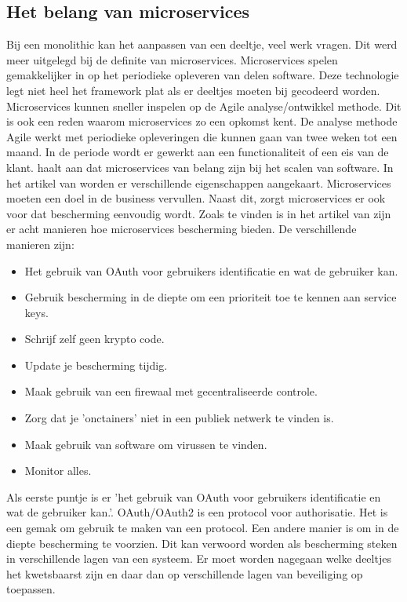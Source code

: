 \subsection{Het belang van microservices}
Bij een monolithic kan het aanpassen van een deeltje, veel werk vragen. Dit werd meer uitgelegd bij de definite van microservices. Microservices spelen gemakkelijker in op het periodieke opleveren van delen software. Deze technologie legt niet heel het framework plat als er deeltjes moeten bij gecodeerd worden. Microservices kunnen sneller inspelen op de Agile analyse/ontwikkel methode. Dit is ook een reden waarom microservices zo een opkomst kent. De analyse methode Agile werkt met periodieke opleveringen die kunnen gaan van twee weken tot een maand. In de periode wordt er gewerkt aan een functionaliteit of een eis van de klant. 
\textcite{series2018} haalt aan dat microservices van belang zijn bij het scalen van software.
In het artikel van \textcite{RDX2016} worden er verschillende eigenschappen aangekaart. Microservices moeten een doel in de business vervullen. Naast dit, zorgt microservices er ook voor dat bescherming eenvoudig wordt. 
Zoals te vinden is in het artikel van \textcite{Troisi2019} zijn er acht manieren hoe microservices bescherming bieden. 
De verschillende manieren zijn:
\begin{itemize}
	\item Het gebruik van OAuth voor gebruikers identificatie en wat de gebruiker kan.
	\item Gebruik bescherming in de diepte om een prioriteit toe te kennen aan service keys.
	\item Schrijf zelf geen krypto code.
	\item Update je bescherming tijdig.
	\item Maak gebruik van een firewaal met gecentraliseerde controle.
	\item Zorg dat je 'onctainers' niet in een publiek netwerk te vinden is. 
	\item Maak gebruik van software om virussen te vinden.
	\item Monitor alles.
\end{itemize}
Als eerste puntje is er 'het gebruik van OAuth voor gebruikers identificatie en wat de gebruiker kan.'.  OAuth/OAuth2 is een protocol voor authorisatie. Het is een gemak om gebruik te maken van een protocol. 
Een andere manier is om in de diepte bescherming te voorzien. Dit kan verwoord worden als bescherming steken in verschillende lagen van een systeem. Er moet worden nagegaan welke deeltjes het kwetsbaarst zijn en daar dan op verschillende lagen van beveiliging op toepassen. 
